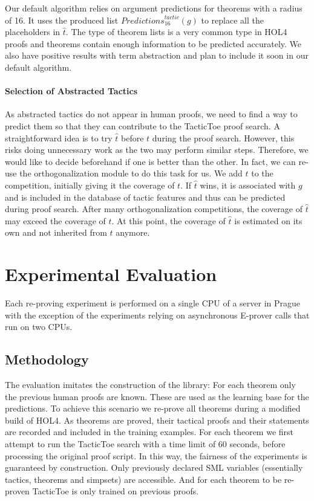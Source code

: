 \documentclass[runningheads,a4paper,draft]{svjour3}
\def\holfour{\textsf{HOL4}\xspace}
\def\eprover{\textsf{E-prover}\xspace}
\def\sml{\textsf{SML}\xspace}
\def\tactictoe{\textsf{TacticToe}\xspace}
\begin{document}
Our default algorithm relies on argument predictions for theorems with a
radius of 16. It uses the produced list
$\mathit{Predictions}^{\mathit{tactic}}_{16}(g)$ to replace all the
placeholders
in $\hat{t}$.
The type of theorem lists is a very common type in \holfour proofs and theorems contain
enough information to be predicted accurately.
We also have positive results with term abstraction and plan to include it soon
in our default algorithm.

\paragraph{Selection of Abstracted Tactics}
As abstracted tactics do not appear in human proofs, we need to find a way to
predict them so that they can contribute to the \tactictoe proof search.
A straightforward idea is to try $\hat{t}$ before $t$ during the proof search.
However, this risks doing unnecessary work as the two may perform similar steps.
Therefore, we would like to decide
beforehand if one is better than the other.
In fact, we can re-use the orthogonalization module to do this task for us.
We add $\hat{t}$ to the competition, initially giving it the coverage of $t$.
If $\hat{t}$
wins, it is associated with $g$ and is included in the database of tactic
features and thus can be predicted during proof search.
After many orthogonalization competitions, the coverage of $\hat{t}$ may exceed
the coverage of
$t$. At
this point, the coverage of $\hat{t}$ is estimated on its own and not inherited
from
$t$ anymore.




\section{Experimental Evaluation}\label{s:experiments}
Each re-proving experiment is performed on a single CPU of a server in Prague
with the exception of the experiments
relying on asynchronous \eprover calls that run on two CPUs.


\subsection{Methodology}
The evaluation imitates the construction of the library: For each theorem only
the previous human proofs are known. These are used as the learning base for
the predictions.
To achieve this scenario we re-prove all theorems during a modified build of
\holfour.
As theorems are proved, their tactical proofs and their statements are
recorded and included in the training examples.
For each theorem we first attempt to run the \tactictoe search with a time
limit of 60 seconds, before processing the original proof script.
In this way, the fairness of the experiments is guaranteed by construction.
Only previously declared \sml
variables (essentially tactics, theorems and simpsets) are accessible.
And for each theorem to be re-proven \tactictoe is only trained on previous
proofs.
\end{document}
